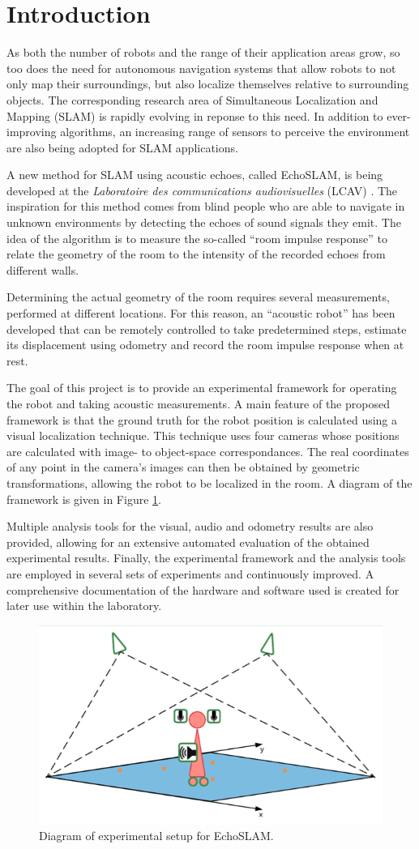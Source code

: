\section{Introduction}

\setlength{\parskip}{1em}
As both the number of robots and the range of their application areas grow, so too does the need for autonomous navigation systems that allow robots to not only map their surroundings, but also localize themselves relative to surrounding objects.
The corresponding research area of Simultaneous Localization and Mapping (SLAM) is rapidly evolving in reponse to this need. In addition to ever-improving algorithms, an increasing range of sensors to perceive the environment are also being adopted for SLAM applications. 

A new method for SLAM using acoustic echoes, called EchoSLAM, is being developed at the \textit{Laboratoire des communications audiovisuelles} (LCAV) \cite{Miranda}. The inspiration for this method comes from blind people who are able to navigate in unknown environments by detecting the echoes of sound signals they emit. The idea of the algorithm is to measure the so-called ``room impulse response'' to relate the geometry of the room to the intensity of the recorded echoes from different walls. 

Determining the actual geometry of the room requires several measurements, performed at different locations. 
For this reason, an ``acoustic robot'' has been developed that can be remotely controlled to take predetermined steps, estimate its displacement using odometry and record the room impulse response when at rest. 

The goal of this project is to provide an experimental framework for operating the robot and taking acoustic measurements. 
A main feature of the proposed framework is that the ground truth for the robot position is calculated using a visual localization technique. 
This technique uses four cameras whose positions are calculated with image- to object-space correspondances. 
The real coordinates of any point in the camera's images can then be obtained by geometric transformations, allowing the robot to be localized in the room.
A diagram of the framework is given in Figure \ref{fig:setup}. 

Multiple analysis tools for the visual, audio and odometry results are also provided, allowing for an extensive automated evaluation of the obtained experimental results. 
Finally, the experimental framework and the analysis tools are employed in several sets of experiments and continuously improved. A comprehensive documentation of the hardware and software used is created for later use within the laboratory.  


\begin{figure}[b]
    \centering
    \includegraphics[width=.6\linewidth]{files/Setup.png}
    \caption{Diagram of experimental setup for EchoSLAM.}
    \label{fig:setup}
\end{figure}

\setlength{\parskip}{0em}
